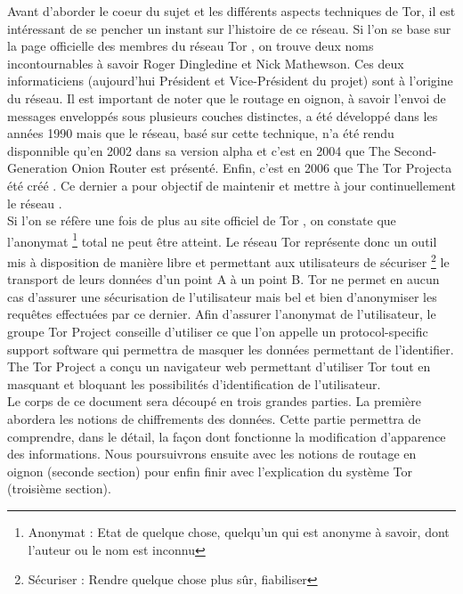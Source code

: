 \documentclass[letterpaper]{article}
\begin{document}
Avant d'aborder le coeur du sujet et les différents aspects techniques de Tor, il est intéressant de se pencher un instant sur l'histoire de ce réseau. Si l'on se base sur la page officielle des membres du réseau Tor \cite{ref2}, on trouve deux noms incontournables à savoir Roger Dingledine et Nick Mathewson. Ces deux informaticiens (aujourd'hui Président et Vice-Président du projet) sont à l'origine du réseau. Il est important de noter que le routage en oignon, à savoir l'envoi de messages enveloppés sous plusieurs couches distinctes, a été développé dans les années 1990 mais que le réseau, basé sur cette technique, n'a été rendu disponnible qu'en 2002 dans sa version alpha \cite{ref4} et c'est en 2004 que \og The Second-Generation Onion Router \fg est présenté. Enfin, c'est en 2006 que \og The Tor Project\fg a été créé \cite{ref3}. Ce dernier a pour objectif de maintenir et mettre à jour continuellement le réseau \cite{ref1}.  \\

Si l'on se réfère une fois de plus au site officiel de Tor \cite{ref1}, on constate que l'anonymat \footnote{Anonymat : Etat de quelque chose, quelqu'un qui est anonyme à savoir, dont l'auteur ou le nom est inconnu} total ne peut être atteint. Le réseau Tor représente donc un outil mis à disposition de manière libre et permettant aux utilisateurs de sécuriser \footnote{Sécuriser : Rendre quelque chose plus sûr, fiabiliser} le transport de leurs données d'un point A à un point B. Tor ne permet en aucun cas d'assurer une sécurisation de l'utilisateur mais bel et bien d'anonymiser les requêtes effectuées par ce dernier. Afin d'assurer l'anonymat de l'utilisateur, le groupe Tor Project conseille d'utiliser ce que l'on appelle un \og protocol-specific support software \fg qui permettra de masquer les données permettant de l'identifier. The Tor Project a conçu un navigateur web permettant d'utiliser Tor tout en masquant et bloquant les possibilités d'identification de l'utilisateur. \\

Le corps de ce document sera découpé en trois grandes parties. La première abordera les notions de chiffrements des données. Cette partie permettra de comprendre, dans le détail, la façon dont fonctionne la modification d'apparence des informations. Nous poursuivrons ensuite avec les notions de routage en oignon (seconde section) pour enfin finir avec l'explication du système Tor (troisième section).
\end{document}

